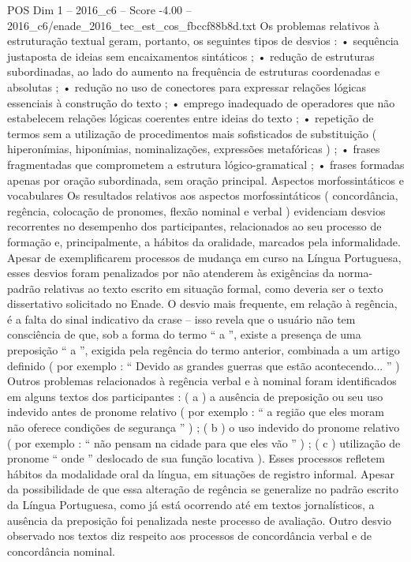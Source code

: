 \begin{textsample}{POS Dim 1 – 2016\_c6 – Score -4.00 – 2016\_c6/enade\_2016\_tec\_est\_cos\_fbccf88b8d.txt}
Os problemas relativos à estruturação textual geram, portanto, os seguintes tipos de desvios : • sequência justaposta de ideias sem encaixamentos sintáticos ; • redução de estruturas subordinadas, ao lado do aumento na frequência de estruturas coordenadas e absolutas ; • redução no uso de conectores para expressar relações lógicas essenciais à construção do texto ; • emprego inadequado de operadores que não estabelecem relações lógicas coerentes entre ideias do texto ; • repetição de termos sem a utilização de procedimentos mais sofisticados de substituição ( hiperonímias, hiponímias, nominalizações, expressões metafóricas ) ; • frases fragmentadas que comprometem a estrutura lógico-gramatical ; • frases formadas apenas por oração subordinada, sem oração principal.
Aspectos morfossintáticos e vocabulares Os resultados relativos aos aspectos morfossintáticos ( concordância, regência, colocação de pronomes, flexão nominal e verbal ) evidenciam desvios recorrentes no desempenho dos participantes, relacionados ao seu processo de formação e, principalmente, a hábitos da oralidade, marcados pela informalidade.
Apesar de exemplificarem processos de mudança em curso na Língua Portuguesa, esses desvios foram penalizados por não atenderem às exigências da norma-padrão relativas ao texto escrito em situação formal, como deveria ser o texto dissertativo solicitado no Enade.
O desvio mais frequente, em relação à regência, é a falta do sinal indicativo da crase – isso revela que o usuário não tem consciência de que, sob a forma do termo “ a ”, existe a presença de uma preposição “ a ”, exigida pela regência do termo anterior, combinada a um artigo definido ( por exemplo : “ Devido as grandes guerras que estão acontecendo... ” ) Outros problemas relacionados à regência verbal e à nominal foram identificados em alguns textos dos participantes : ( a ) a ausência de preposição ou seu uso indevido antes de pronome relativo ( por exemplo : “ a região que eles moram não oferece condições de segurança ” ) ; ( b ) o uso indevido do pronome relativo ( por exemplo : “ não pensam na cidade para que eles vão ” ) ; ( c ) utilização de pronome “ onde ” deslocado de sua função locativa ).
Esses processos refletem hábitos da modalidade oral da língua, em situações de registro informal.
Apesar da possibilidade de que essa alteração de regência se generalize no padrão escrito da Língua Portuguesa, como já está ocorrendo até em textos jornalísticos, a ausência da preposição foi penalizada neste processo de avaliação.
Outro desvio observado nos textos diz respeito aos processos de concordância verbal e de concordância nominal.

\end{textsample}
